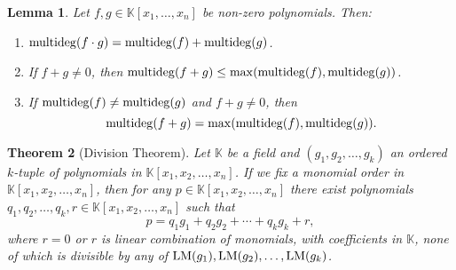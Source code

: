 \documentclass[a4paper,12pt]{article}
\newtheorem{theorem}{Theorem}[section]
\newtheorem{lemma}[theorem]{Lemma}
\newcommand{\KK}{\mathbb{K}}
\newcommand{\LM }{{\rm LM}}
\newcommand{\mdeg}{{\rm multideg}}
\newcommand{\ind}[2]{#1_1,#1_2,\ldots,#1_#2}
\begin{document}
\begin{lemma}\label{l:mdeg}
	Let $f, g \in \KK[x_1, \ldots, x_n]$ be non-zero polynomials. Then:
	\begin{enumerate}
		\item $\mdeg(f\cdot g) = \mdeg(f) + \mdeg(g)$.
		\item If $f + g \neq 0$, then $\mdeg(f+g) \leq \max(\mdeg(f), \mdeg(g))$.
		\item If $\mdeg(f) \neq \mdeg(g)$ and $f+g \neq 0$, then $$\mdeg(f+g) = \max(\mdeg(f), \mdeg(g)).$$
	\end{enumerate}
\end{lemma}

\begin{theorem}[Division Theorem]\label{theo:algdivsaovariasindeterminadas}
	Let $ \KK $ be a field and $ ( g_1,g_2, \ldots, g_k)  $ an ordered $ k $-tuple of polynomials in $ \KK[\ind{x}{n}] $. If we fix a monomial order in $ \KK[\ind{x}{n}]   $, then for any $ p\in \KK[\ind{x}{n}] $ there exist polynomials $ q_1,q_2, \ldots, q_k, r \in  \KK[\ind{x}{n}]$ such that 
	\[
	p=q_1g_1+q_2g_2+ \cdots+ q_kg_k+ r,
	\]
	where $ r=0 $ or  $ r $ is linear combination of monomials, with coefficients in $ \KK $, none of which is divisible by any of $ \LM(g_1), \LM (g_2),\ldots,\LM (g_k) $.
\end{theorem}
\end{document}
